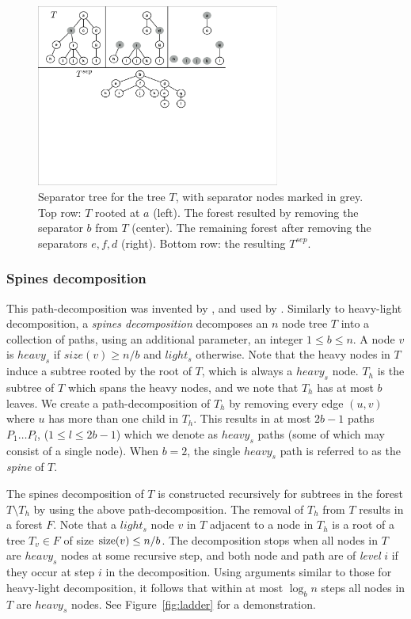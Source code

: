 				\begin{figure}[!ht]
				\centering
				\includegraphics[width=80mm]{./Figures/Separator.pdf}
				\caption{Separator tree  for  the tree  $T$, with separator nodes marked  in grey. Top row:  $T$ rooted at $a$ (left). The forest resulted by removing the separator $b$ from  $T$ (center).  The remaining  forest after removing the  separators $e,f,d$ (right). Bottom row: the resulting $T^{sep}$. }
				\label{fig:separator}
			\end{figure}
			

 
\subsubsection{Spines decomposition}\label{tec:Splines}
This path-decomposition was invented by , and used by .
Similarly to heavy-light decomposition, a \emph{spines decomposition}  decomposes an $n$ node tree $T$  into  a collection of paths, using an additional parameter, an integer $1 \leq b \leq n$.
A node $v$ is $heavy_{s}$ if $size(v) \geq n/b$ and $light_{s}$ otherwise. 
Note that the heavy nodes in $T$ induce a subtree rooted by the root of $T$, which is always  a $heavy_{s}$ node.
$T_h$ is the subtree of $T$ which spans the heavy nodes, and we note that  $T_h$ has at most $b$ leaves.
We  create a path-decomposition of $T_h$  by removing  every edge $(u,v)$ where $u$ has more than one child in $T_h$.
 This results in at most  $2b-1$ paths  $P_1 \dots P_l$, ($1 \leq l \leq 2b-1$) which  we denote as  $heavy_{s}$ paths (some of which may consist of a single node). When $b=2$, the  single $heavy_{s}$  path is referred  to  as the \emph{ spine} of $T$.

The spines decomposition of $T$ is  constructed recursively for subtrees in the forest $T \setminus T_h$ by using the above path-decomposition. 
The removal of $T_h$ from $T$ results in a forest $F$.
Note that a $light_{s}$ node $v$ in $T$ adjacent to a node in $T_h$ is  a root of a tree $T_v \in F$ of size $\operatorname{size}(v) \leq n/b$.
The decomposition stops when all nodes in $T$ are  $heavy_{s}$ nodes at some recursive step, and both node and path are of  \emph{level} $i$ if they occur at step $i$ in the decomposition.
Using  arguments similar to those for heavy-light decomposition, it follows that within at most $\log_{b} n$  steps all nodes in $T$ are $heavy_{s}$ nodes. 
See Figure~\ref{fig:ladder} for a demonstration.

